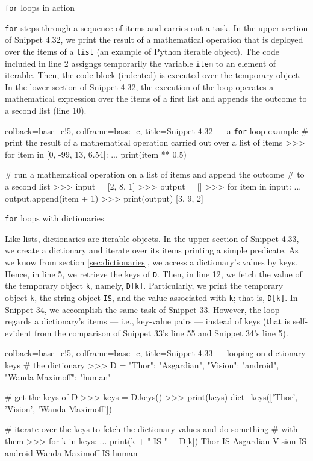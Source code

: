 \documentclass[a4paper,11pt]{book}
\numberwithin{figure}{chapter}
\numberwithin{table}{chapter}
\newcommand{\question}[1]{%
    \begin{tcolorbox}[colback=comp_c!10,colframe=comp_c,sidebyside align=top,width=\linewidth,before skip=1ex]
        #1
    \end{tcolorbox}
    \switchcolumn%
}
\newcommand{\note}[1]{%
    \begin{tcolorbox}[colback=white!0,colframe=white!10,width=\linewidth,before skip=1ex]
        #1
    \end{tcolorbox}
}
\begin{document}
\begin{paracol}{2}
	\question{\raggedright \texttt{for} loops in action}
	\note{\href{https://docs.python.org/3/reference/compound_stmts.html\#for}{\texttt{for}} steps through a sequence of items and carries out a task. In the upper section of Snippet 4.32, we print the result of a mathematical operation that is deployed over the items of a \texttt{list} (an example of Python iterable object). The code included in line 2 assigngs temporarily the variable \texttt{item} to an element of iterable. Then, the code block (indented) is executed over the temporary object. In the lower section of Snippet 4.32, the execution of the loop operates a mathematical expression over the items of a first list and appends the outcome to a second list (line 10).}
\end{paracol}

\begin{pythoncode}[linenos=true,]{colback=base_c!5, colframe=base_c, title=\sffamily Snippet 4.32 --- a \texttt{for} loop example}
# print the result of a mathematical operation carried out over a list of items
>>> for item in [0, -99, 13, 6.54]:
...     print(item ** 0.5)  

# run a mathematical operation on a list of items and append the outcome 
# to a second list 
>>> input = [2, 8, 1]
>>> output = []
>>> for item in input:
...    output.append(item + 1)
>>> print(output)
[3, 9, 2]
\end{pythoncode}
\clearpage
	
\begin{paracol}{2}
	\question{\raggedright \texttt{for} loops with dictionaries}
	\note{Like lists, dictionaries are iterable objects. In the upper section of Snippet 4.33, we create a dictionary and iterate over its items printing a simple predicate. As we know from section \ref{sec:dictionaries}, we access a dictionary's values by keys. Hence, in line 5, we retrieve the keys of \texttt{D}. Then, in line 12, we fetch the value of the temporary object \texttt{k}, namely, \texttt{D[k]}. Particularly, we print the temporary object \texttt{k}, the string object \texttt{IS}, and the value associated with \texttt{k}; that is, \texttt{D[k]}. In Snippet 34, we accomplish the same task of Snippet 33. However, the loop regards a dictionary's items --- i.e., key-value pairs --- instead of keys (that is self-evident from the comparison of Snippet 33's line 55 and Snippet 34's line 5). }
\end{paracol}

\begin{pythoncode}[linenos=true,]{colback=base_c!5, colframe=base_c, title=\sffamily Snippet 4.33 --- looping on dictionary keys}
# the dictionary
>>> D = {"Thor": "Asgardian", "Vision": "android", "Wanda Maximoff": "human"}

# get the keys of D
>>> keys = D.keys()
>>> print(keys)
dict_keys(['Thor', 'Vision', 'Wanda Maximoff'])

# iterate over the keys to fetch the dictionary values and do something 
# with them
>>> for k in keys:
...     print(k + " IS " + D[k])
Thor IS Asgardian
Vision IS android
Wanda Maximoff IS human
\end{pythoncode}
\end{document}
